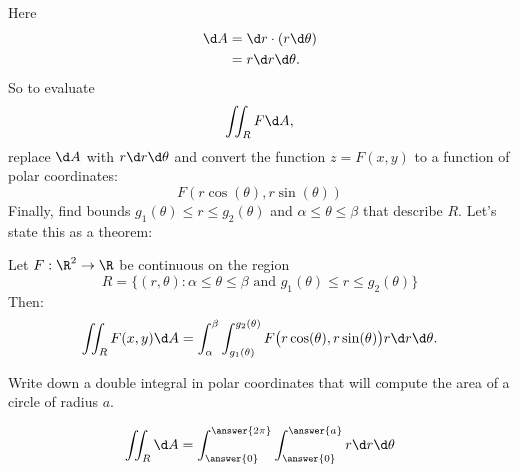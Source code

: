 \documentclass{ximera}
\begin{document}
Here
\begin{align*}
\d A &= \d r \cdot (r \d \theta) \\
&= r \d r \d \theta.
\end{align*}
So to evaluate
\[
\iint_R F\d A,
\]
replace $\d A$ with $r\d r\d\theta$ and convert the function $z=F(x,y)$
to a function of polar coordinates:
\[
F(r\cos(\theta),r\sin(\theta))
\]
Finally, find bounds $g_1(\theta)\leq r\leq g_2(\theta)$ and
$\alpha\leq\theta\leq\beta$ that describe $R$. Let's state this as a
theorem:

\begin{theorem}[Fubini]
  Let $F:\R^2\to\R$ be continuous on the region
  \[
  R=\{(r,\theta):\text{$\alpha\leq\theta\leq\beta$ and $g_1(\theta)\leq r\leq g_2(\theta)$}\}
  \]
  Then: 
  \[
  \iint_R F(x,y)\d A = \int_\alpha^\beta\int_{g_1(\theta)}^{g_2(\theta)} F\big(r\cos(\theta),r\sin(\theta)\big) r\d r\d \theta.
  \]
\end{theorem}

\begin{question}
  Write down a double integral in polar coordinates that will compute
  the area of a circle of radius $a$.
  \begin{prompt}
  \[
  \iint_R \d A = \int_{\answer{0}}^{\answer{2\pi}}
  \int_{\answer{0}}^{\answer{a}}r \d r \d \theta 
  \]
  \end{prompt}
\end{question}



\end{document}
